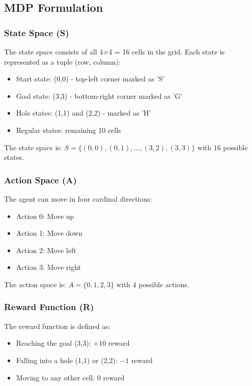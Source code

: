 \documentclass[12pt]{article}
\begin{document}
{{{\subsection{MDP Formulation}

\subsubsection{State Space (S)}

The state space consists of all 4×4 = 16 cells in the grid. Each state is represented as a tuple (row, column):

\begin{itemize}
    \item Start state: (0,0) - top-left corner marked as 'S'
    \item Goal state: (3,3) - bottom-right corner marked as 'G'  
    \item Hole states: (1,1) and (2,2) - marked as 'H'
    \item Regular states: remaining 10 cells
\end{itemize}

The state space is: $S = \{(0,0), (0,1), ..., (3,2), (3,3)\}$ with 16 possible states.

\subsubsection{Action Space (A)}

The agent can move in four cardinal directions:

\begin{itemize}
    \item Action 0: Move up
    \item Action 1: Move down  
    \item Action 2: Move left
    \item Action 3: Move right
\end{itemize}

The action space is: $A = \{0, 1, 2, 3\}$ with 4 possible actions.

\subsubsection{Reward Function (R)}

The reward function is defined as:

\begin{itemize}
    \item Reaching the goal (3,3): $+10$ reward
    \item Falling into a hole (1,1) or (2,2): $-1$ reward
    \item Moving to any other cell: $0$ reward
\end{itemize}

}}}
\end{document}
